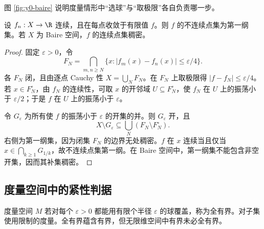 图 \ref{fig:y0-baire} 说明度量情形中“选球”与“取极限”各自负责哪一步。



\begin{proposition}[连续函数逐点极限的不连续点]\label{prop:y0-baire-one}
设 $f_n:X\to\R$ 连续，且在每点收敛于有限值 $f$。则 $f$ 的不连续点集为第一纲集。若 $X$ 为 Baire 空间，$f$ 的连续点集稠密。
\end{proposition}
\begin{proof}
固定 $\varepsilon>0$，令
\[
 F_N=\bigcap_{m,n\ge N}\{x:|f_m(x)-f_n(x)|\le\varepsilon/4\}.
\]
各 $F_N$ 闭，且由逐点 Cauchy 性 $X=\bigcup_NF_N$。在 $F_N$ 上取极限得 $|f-f_N|\le\varepsilon/4$。若 $x\in F_N^\circ$，由 $f_N$ 的连续性，可取 $x$ 的开邻域 $U\subseteq F_N^\circ$，使 $f_N$ 在 $U$ 上的振荡小于 $\varepsilon/2$；于是 $f$ 在 $U$ 上的振荡小于 $\varepsilon$。

令 $G_\varepsilon$ 为所有使 $f$ 的振荡小于 $\varepsilon$ 的开集的并。则 $G_\varepsilon$ 开，且
\[
 X\setminus G_\varepsilon\subseteq
          \bigcup_N(F_N\setminus F_N^\circ).
\]
右侧为第一纲集，因为闭集 $F_N$ 的边界无处稠密。$f$ 在 $x$ 连续当且仅当 $x\in\bigcap_{k\ge1}G_{1/k}$，故不连续点集第一纲。在 Baire 空间中，第一纲集不能包含非空开集，因而其补集稠密。
\end{proof}

\subsection{度量空间中的紧性判据}
\begin{definition}[全有界]\label{def:y0-total-bounded}
度量空间 $M$ 若对每个 $\varepsilon>0$ 都能用有限个半径 $\varepsilon$ 的球覆盖，称为全有界。对子集使用限制的度量。全有界蕴含有界，但无限维空间中有界未必全有界。
\end{definition}

